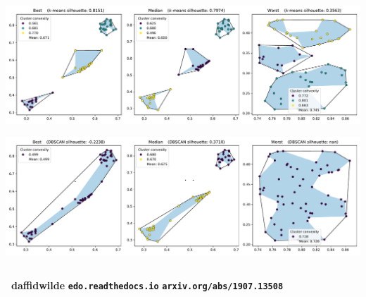 \documentclass{beamer}
\begin{document}
\begin{columns}
\begin{column}{0.3\textwidth}
        \vfill%
        \begin{center}
            \includegraphics[width=\linewidth]{img/Fig12a.pdf}

            \vspace{1em}

            \includegraphics[width=\linewidth]{img/Fig12b.pdf}
        \end{center}
    \end{column}
\end{columns}


\vfill%
\begin{center}
    \huge{%
        \quad%
        \textbf{\faGithub~\faTwitter\quad daffidwilde}
        \hfill%
        \textbf{\faBook\quad \texttt{edo.readthedocs.io}}
        \hfill%
        \textbf{\faNewspaperO\quad \texttt{arxiv.org/abs/1907.13508}}
        \quad%
    }
\end{center}\vspace{1em}
\end{document}
